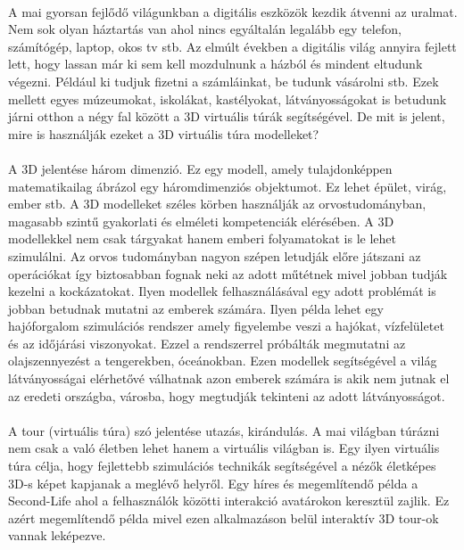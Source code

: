 \paragraph{}
A mai gyorsan fejlődő világunkban a digitális eszközök kezdik átvenni az uralmat. Nem sok olyan háztartás van ahol nincs egyáltalán legalább egy telefon, számítógép, laptop, okos tv stb. Az elmúlt években a digitális világ annyira fejlett lett, hogy lassan már ki sem kell mozdulnunk a házból és mindent eltudunk végezni. Például ki tudjuk fizetni a számláinkat, be tudunk vásárolni stb. Ezek mellett egyes múzeumokat, iskolákat, kastélyokat, látványosságokat is betudunk járni otthon a négy fal között a 3D virtuális túrák segítségével. De mit is jelent, mire is használják ezeket a 3D virtuális túra modelleket?
\paragraph{}
A 3D jelentése három dimenzió. Ez egy modell, amely tulajdonképpen matematikailag ábrázol egy háromdimenziós objektumot. Ez lehet épület, virág, ember stb. A 3D modelleket széles körben használják az orvostudományban, magasabb szintű gyakorlati és elméleti kompetenciák elérésében. A 3D modellekkel nem csak tárgyakat hanem emberi folyamatokat is le lehet szimulálni. Az orvos tudományban nagyon szépen letudják előre játszani az operációkat így biztosabban fognak neki az adott műtétnek mivel jobban tudják kezelni a kockázatokat. Ilyen modellek felhasználásával egy adott problémát is jobban betudnak mutatni az emberek számára. Ilyen példa lehet egy hajóforgalom szimulációs rendszer amely figyelembe veszi a hajókat, vízfelületet és az időjárási viszonyokat. Ezzel a rendszerrel próbálták megmutatni az olajszennyezést a tengerekben, óceánokban.\cite{dedov2017design} Ezen modellek segítségével a világ látványosságai elérhetővé válhatnak azon emberek számára is akik nem jutnak el az eredeti országba, városba, hogy megtudják tekinteni az adott látványosságot.
\paragraph{}
A tour (virtuális túra) szó jelentése utazás, kirándulás. A mai világban túrázni nem csak a való életben lehet hanem a virtuális világban is. Egy ilyen virtuális túra célja, hogy fejlettebb szimulációs technikák segítségével a nézők életképes 3D-s képet kapjanak a meglévő helyről. Egy híres és megemlítendő példa a Second-Life ahol a felhasználók közötti interakció avatárokon keresztül zajlik. Ez azért megemlítendő példa mivel ezen alkalmazáson belül interaktív 3D tour-ok vannak leképezve.\cite{moloo20163d}
